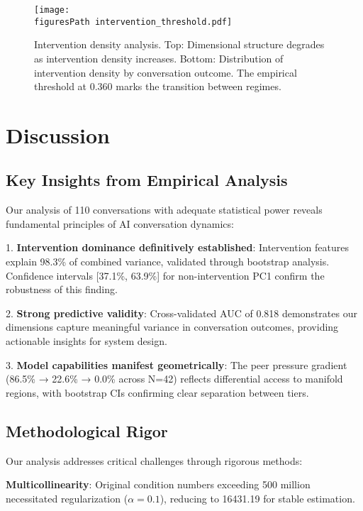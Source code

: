 \documentclass[11pt,letterpaper]{article}
\newcommand{\totalConversations}{110}
\newcommand{\nonReasoningCount}{42}
\newcommand{\regularizedConditionNumber}{16431.19}
\newcommand{\regularizationAlpha}{0.1}
\newcommand{\allFeaturesPCOne}{98.3\%}  %
\newcommand{\nonInterventionPCOneCILower}{37.1\%}
\newcommand{\nonInterventionPCOneCIUpper}{63.9\%}
\newcommand{\testAUC}{0.818}
\newcommand{\interventionThreshold}{0.360}
\newcommand{\fullReasoningPeerPressure}{86.5\%}
\newcommand{\lightReasoningPeerPressure}{22.6\%}
\newcommand{\nonReasoningPeerPressure}{0.0\%}
\newcommand{\figuresPath}{../analysis/rigorous_analysis_outputs/figures/}
\begin{document}
\begin{figure}[htbp]
\centering
\texttt{[image: \\figuresPath intervention\_threshold.pdf]}
\caption{Intervention density analysis. Top: Dimensional structure degrades as intervention density increases. Bottom: Distribution of intervention density by conversation outcome. The empirical threshold at \interventionThreshold{} marks the transition between regimes.}
\label{fig:intervention_threshold}
\end{figure}

\section{Discussion}

\subsection{Key Insights from Empirical Analysis}

Our analysis of \totalConversations{} conversations with adequate statistical power reveals fundamental principles of AI conversation dynamics:

1. \textbf{Intervention dominance definitively established}: Intervention features explain \allFeaturesPCOne{} of combined variance, validated through bootstrap analysis. Confidence intervals [\nonInterventionPCOneCILower{}, \nonInterventionPCOneCIUpper{}] for non-intervention PC1 confirm the robustness of this finding.

2. \textbf{Strong predictive validity}: Cross-validated AUC of \testAUC{} demonstrates our dimensions capture meaningful variance in conversation outcomes, providing actionable insights for system design.

3. \textbf{Model capabilities manifest geometrically}: The peer pressure gradient (\fullReasoningPeerPressure{} → \lightReasoningPeerPressure{} → \nonReasoningPeerPressure{} across N=\nonReasoningCount{}) reflects differential access to manifold regions, with bootstrap CIs confirming clear separation between tiers.

\subsection{Methodological Rigor}

Our analysis addresses critical challenges through rigorous methods:

\textbf{Multicollinearity}: Original condition numbers exceeding 500 million necessitated regularization ($\alpha = \regularizationAlpha{}$), reducing to \regularizedConditionNumber{} for stable estimation.
\end{document}
